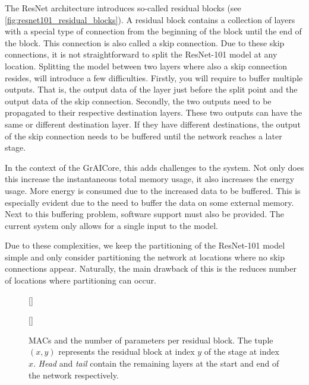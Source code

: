 The ResNet architecture introduces so-called residual blocks (see \cref{fig:resnet101_residual_blocks}).
A residual block contains a collection of layers with a special type of connection from the beginning of the block until the end of the block.
This connection is also called a skip connection.
Due to these skip connections, it is not straightforward to split the ResNet-101 model at any location.
Splitting the model between two layers where also a skip connection resides, will introduce a few difficulties.
Firstly, you will require to buffer multiple outputs.
That is, the output data of the layer just before the split point and the output data of the skip connection.
Secondly, the two outputs need to be propagated to their respective destination layers.
These two outputs can have the same or different destination layer.
If they have different destinations, the output of the skip connection needs to be buffered until the network reaches a later stage.

In the context of the GrAICore, this adds challenges to the system.
Not only does this increase the instantaneous total memory usage, it also increases the energy usage.
More energy is consumed due to the increased data to be buffered.
This is especially evident due to the need to buffer the data on some external memory.
Next to this buffering problem, software support must also be provided.
The current system only allows for a single input to the model. 

Due to these complexities, we keep the partitioning of the ResNet-101 model simple and only consider partitioning the network at locations where no skip connections appear.
Naturally, the main drawback of this is the reduces number of locations where partitioning can occur.

\begin{figure}[hbtp]
    \centering
    [\textwidth]{
        
    }
    [\textwidth]{
        
    }
    \caption{
        MACs and the number of parameters per residual block.
        The tuple $(x, y)$ represents the residual block at index $y$ of the stage at index $x$.
        \textit{Head} and \textit{tail} contain the remaining layers at the start and end of the network respectively.
    }
    \label{fig:resnet101_stats}
\end{figure}

